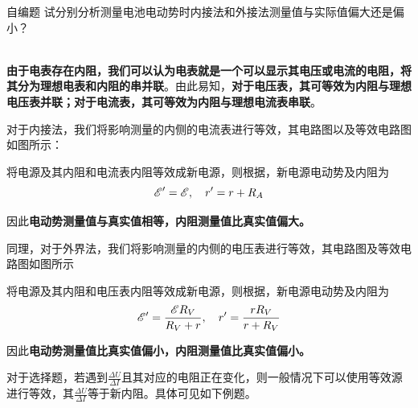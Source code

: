 \begin{ep}{自编题}{}
试分别分析测量电池电动势时内接法和外接法测量值与实际值偏大还是偏小？

~\\
\textbf{由于电表存在内阻，我们可以认为电表就是一个可以显示其电压或电流的电阻，将其分为理想电表和内阻的串并联}。由此易知，\textbf{对于电压表，其可等效为内阻与理想电压表并联；对于电流表，其可等效为内阻与理想电流表串联}。

对于内接法，我们将影响测量的内侧的电流表进行等效，其电路图以及等效电路图如图所示：



将电源及其内阻和电流表内阻等效成新电源，则根据，新电源电动势及内阻为
$$ \mathscr{E}^{\prime} = \mathscr{E} ,\quad r^{\prime} = r + R_A $$

因此\textbf{电动势测量值与真实值相等，内阻测量值比真实值偏大。}

同理，对于外界法，我们将影响测量的内侧的电压表进行等效，其电路图及等效电路图如图所示



将电源及其内阻和电压表内阻等效成新电源，则根据，新电源电动势及内阻为
$$ \mathscr{E}^{\prime} = \frac{ \mathscr{E} R_V}{R_V + r} ,\quad r^{\prime} = \frac{r R_V}{r + R_V} $$

因此\textbf{电动势测量值比真实值偏小，内阻测量值比真实值偏小。}
\end{ep}

对于选择题，若遇到$\frac{\Delta U}{\Delta I}$且其对应的电阻正在变化，则一般情况下可以使用等效源进行等效，其$\frac{\Delta U}{\Delta I}$等于新内阻。具体可见如下例题。

